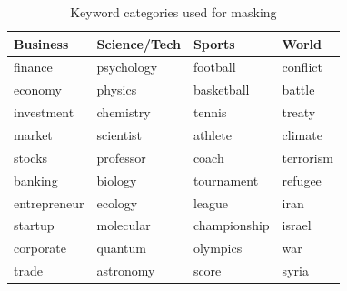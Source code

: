 \documentclass[12pt,a4paper,english]{article}
\begin{document}
\begin{table}[h]
\centering
\begin{tabular}{llll}
\textbf{Business} & \textbf{Science/Tech} & \textbf{Sports} & \textbf{World} \\ \hline

finance & psychology & football & conflict \\
economy & physics & basketball & battle \\
investment & chemistry & tennis & treaty \\
market & scientist & athlete & climate \\
stocks & professor & coach & terrorism \\
banking & biology & tournament & refugee \\
entrepreneur & ecology & league & iran \\
startup & molecular & championship & israel \\
corporate & quantum & olympics & war \\
trade & astronomy & score & syria \\

\end{tabular}
\caption{Keyword categories used for masking}
\end{table}
\end{document}
